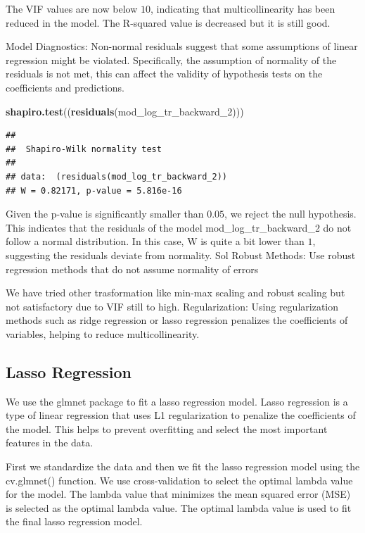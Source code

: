 \documentclass[
]{article}
\newenvironment{Shaded}{\begin{snugshade}}{\end{snugshade}}
\newcommand{\FunctionTok}[1]{\textcolor[rgb]{0.13,0.29,0.53}{\textbf{#1}}}
\newcommand{\NormalTok}[1]{#1}
\begin{document}
The VIF values are now below \(10\), indicating that multicollinearity
has been reduced in the model. The R-squared value is decreased but it
is still good.

Model Diagnostics: Non-normal residuals suggest that some assumptions of
linear regression might be violated. Specifically, the assumption of
normality of the residuals is not met, this can affect the validity of
hypothesis tests on the coefficients and predictions.

\begin{Shaded}
\begin{Highlighting}[]
\FunctionTok{shapiro.test}\NormalTok{((}\FunctionTok{residuals}\NormalTok{(mod\_log\_tr\_backward\_2)))}
\end{Highlighting}
\end{Shaded}

\begin{verbatim}
## 
##  Shapiro-Wilk normality test
## 
## data:  (residuals(mod_log_tr_backward_2))
## W = 0.82171, p-value = 5.816e-16
\end{verbatim}

Given the p-value is significantly smaller than \(0.05\), we reject the
null hypothesis. This indicates that the residuals of the model
mod\_log\_tr\_backward\_2 do not follow a normal distribution. In this
case, W is quite a bit lower than \(1\), suggesting the residuals
deviate from normality. Sol Robust Methods: Use robust regression
methods that do not assume normality of errors

We have tried other trasformation like min-max scaling and robust
scaling but not satisfactory due to VIF still to high. Regularization:
Using regularization methods such as ridge regression or lasso
regression penalizes the coefficients of variables, helping to reduce
multicollinearity.

\hypertarget{lasso-regression}{%
\subsection{Lasso Regression}\label{lasso-regression}}

We use the glmnet package to fit a lasso regression model. Lasso
regression is a type of linear regression that uses L1 regularization to
penalize the coefficients of the model. This helps to prevent
overfitting and select the most important features in the data.

First we standardize the data and then we fit the lasso regression model
using the cv.glmnet() function. We use cross-validation to select the
optimal lambda value for the model. The lambda value that minimizes the
mean squared error (MSE) is selected as the optimal lambda value. The
optimal lambda value is used to fit the final lasso regression model.
\end{document}
